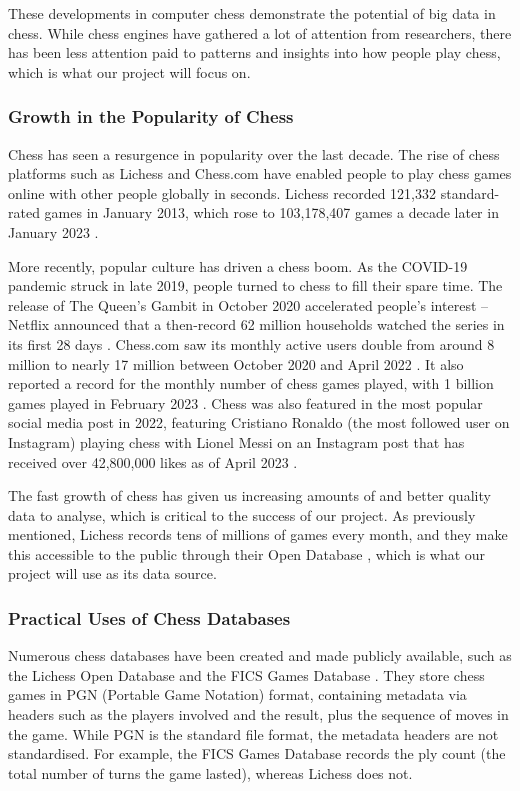 \documentclass[a4paper, 11pt]{article}
\begin{document}
These developments in computer chess demonstrate the potential of big data in chess. While chess engines have gathered a lot of attention from researchers, there has been less attention paid to patterns and insights into how people play chess, which is what our project will focus on.

\subsubsection{Growth in the Popularity of Chess}
Chess has seen a resurgence in popularity over the last decade. The rise of chess platforms such as Lichess and Chess.com have enabled people to play chess games online with other people globally in seconds. Lichess recorded 121,332 standard-rated games in January 2013, which rose to 103,178,407 games a decade later in January 2023 \cite{lichessOpenDatabase}. 

More recently, popular culture has driven a chess boom. As the COVID-19 pandemic struck in late 2019, people turned to chess to fill their spare time. The release of The Queen's Gambit in October 2020 accelerated people's interest -- Netflix announced that a then-record 62 million households watched the series in its first 28 days \cite{chessIsBooming}. Chess.com saw its monthly active users double from around 8 million to nearly 17 million between October 2020 and April 2022 \cite{chessIsBooming}. It also reported a record for the monthly number of chess games played, with 1 billion games played in February 2023 \cite{chessCom1BillionGamesInFebruary}. Chess was also featured in the most popular social media post in 2022, featuring Cristiano Ronaldo (the most followed user on Instagram) playing chess with Lionel Messi on an Instagram post that has received over 42,800,000 likes as of April 2023 \cite{ronaldoMessiChess}.

The fast growth of chess has given us increasing amounts of and better quality data to analyse, which is critical to the success of our project. As previously mentioned, Lichess records tens of millions of games every month, and they make this accessible to the public through their Open Database \cite{lichessOpenDatabase}, which is what our project will use as its data source.

\subsubsection{Practical Uses of Chess Databases}
Numerous chess databases have been created and made publicly available, such as the Lichess Open Database \cite{lichessOpenDatabase} and the FICS Games Database \cite{ficsGamesDatabase}. They store chess games in PGN (Portable Game Notation) format, containing metadata via headers such as the players involved and the result, plus the sequence of moves in the game. While PGN is the standard file format, the metadata headers are not standardised. For example, the FICS Games Database records the ply count (the total number of turns the game lasted), whereas Lichess does not.
\end{document}
